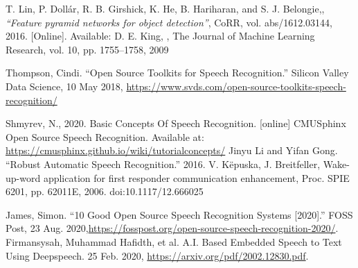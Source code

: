 \begin{thebibliography}{10}
 T. Lin, P. Dollár, R. B. Girshick, K. He, B. Hariharan, and S. J. Belongie,, \textit{“Feature pyramid networks for object detection”}, CoRR, vol. abs/1612.03144, 2016. [Online]. Available: \href{http://arxiv.org/abs/1612.03144}

 D. E. King, , The Journal of Machine Learning Research, vol. 10, pp. 1755–1758, 2009

Thompson, Cindi. “Open Source Toolkits for Speech Recognition.” Silicon Valley Data Science, 10 May 2018, \href{https://www.svds.com/open-source-toolkits-speech-recognition/}{https://www.svds.com/open-source-toolkits-speech-recognition/}

 \href{https://wiki.seeedstudio.com/ReSpeaker_Mic_Array_v2.0/}

\href{https://docs.nvidia.com/jetson/jetpack/introduction/index.html}

\href{https://docs.microsoft.com/en-us/azure/iot-hub/about-iot-hub}

\href{https://docs.microsoft.com/en-us/azure/iot-hub/iot-hub-devguide-direct-methods}

\href{https://docs.microsoft.com/en-us/azure/event-hubs/event-hubs-about}












\bibitem {} Shmyrev, N., 2020. Basic Concepts Of Speech Recognition. [online] CMUSphinx Open Source Speech Recognition. Available at: \href{https://cmusphinx.github.io/wiki/tutorialconcepts/}{https://cmusphinx.github.io/wiki/tutorialconcepts/} 
\bibitem {} Jinyu Li and Yifan Gong. “Robust Automatic Speech Recognition.” 2016. 
V. Këpuska, J. Breitfeller, Wake-up-word application for first responder communication enhancement, Proc. SPIE 6201, pp. 62011E, 2006.  doi:10.1117/12.666025

James, Simon. “10 Good Open Source Speech Recognition Systems [2020].” FOSS Post, 23 Aug. 2020,\href{https://fosspost.org/open-source-speech-recognition-2020/}{https://fosspost.org/open-source-speech-recognition-2020/}. 
Firmansysah, Muhammad Hafidth, et al. A.I. Based Embedded Speech to Text Using Deepspeech. 25 Feb. 2020,
\href{https://arxiv.org/pdf/2002.12830.pdf/}{https://arxiv.org/pdf/2002.12830.pdf}. 

\end{thebibliography}